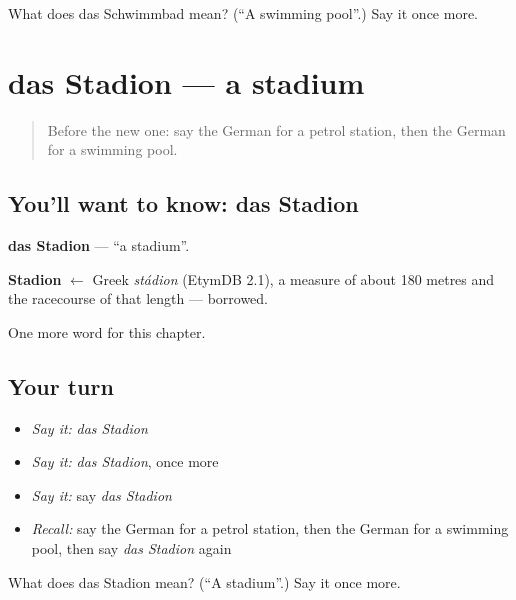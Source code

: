 \begin{tcolorbox}[breakable,colback=teal!4,colframe=teal!35!black,title={Before you move on}]
What does das Schwimmbad mean? (\textquotedblleft{}A swimming pool\textquotedblright{}.) Say it once more.
\end{tcolorbox}
\section[das Stadion]{das Stadion — a stadium}

\label{lesson:GE-C106-stadion}



\begin{quote}
Before the new one: say the German for a petrol station, then the German for a swimming pool.
\end{quote}

\subsection*{You'll want to know: das Stadion}
\textbf{das Stadion} — \textquotedblleft{}a stadium\textquotedblright{}.

\begin{cousinweb}
\textbf{Stadion} $\leftarrow$ Greek \emph{stádion} (EtymDB 2.1), a measure of about 180 metres and the racecourse of that length — borrowed.
\end{cousinweb}

\begin{grammarlens}[title={What you've built}]
One more word for this chapter.
\end{grammarlens}

\subsection*{Your turn}
\begin{itemize}
\raggedright
  \item \emph{Say it:} \emph{das Stadion}
  \item \emph{Say it:} \emph{das Stadion}, once more
  \item \emph{Say it:} say \emph{das Stadion}
  \item \emph{Recall:} say the German for a petrol station, then the German for a swimming pool, then say \emph{das Stadion} again
\end{itemize}

\begin{tcolorbox}[breakable,colback=teal!4,colframe=teal!35!black,title={Before you move on}]
What does das Stadion mean? (\textquotedblleft{}A stadium\textquotedblright{}.) Say it once more.
\end{tcolorbox}

